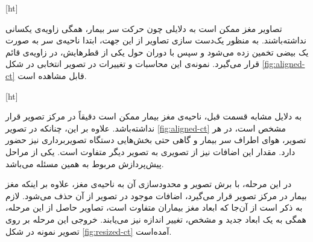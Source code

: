 
[ht]
    
تصاویر مغز ممکن است به دلایلی چون حرکت سر بیمار، همگی زاویه‌ی یکسانی نداشته‌باشند.
به منظور یک‌دست سازی تصاویر از این جهت، ابتدا ناحیه‌ی سر به صورت یک بیضی تخمین زده می‌شود و سپس با دوران حول یکی از قطر‌هایش، در زاویه‌ی قائم قرار می‌گیرد.
نمونه‌ی این محاسبات و تغییرات در تصویر انتخابی در شکل \ref{fig:aligned-ct}
قابل مشاهده است.


[ht]

به دلایل مشابه قسمت قبل، ناحیه‌ی مغز بیمار ممکن است دقیقاً در مرکز تصویر قرار نداشته‌باشد.
علاوه بر این، چنانکه در تصویر \ref{fig:aligned-ct} مشخص است، 
در هر تصویر، هوای اطراف سر بیمار و گاهی حتی بخش‌هایی دستگاه تصویربرداری نیز حضور دارد.
مقدار این اضافات نیز از تصویری به تصویر دیگر متفاوت است.
یکی از مراحل پیش‌پردازش مربوط به همین مسئله می‌باشد.

در این مرحله،
با برش تصویر و محدودسازی آن به ناحیه‌ی مغز،
علاوه بر اینکه مغز بیمار در مرکز تصویر قرار می‌گیرد، اضافات موجود در تصویر از آن حذف می‌شود.
لازم به ذکر است از آن‌جا که ابعاد مغز بیماران متفاوت است، تصاویر حاصل از این مرحله، همگی به یک ابعاد جدید و مشخص، تغییر اندازه نیز می‌یابند.
خروجی این مرحله بر روی تصویر نمونه در شکل 
\ref{fig:resized-ct}
آمده‌است.

